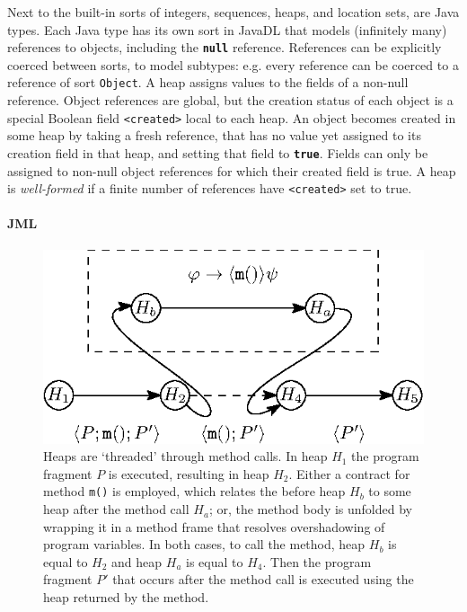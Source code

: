 \documentclass[runningheads]{llncs}
\begin{document}
Next to the built-in sorts of integers, sequences, heaps, and location sets, are Java types. Each Java type has its own sort in JavaDL that models (infinitely many) references to objects, including the \texttt{\textbf{null}} reference. References can be explicitly coerced between sorts, to model subtypes: e.g. every reference can be coerced to a reference of sort \texttt{Object}. A heap assigns values to the fields of a non-null reference.
Object references are global, but the creation status of each object is a special Boolean field \texttt{<created>} local to each heap. An object becomes created in some heap by taking a fresh reference, that has no value yet assigned to its creation field in that heap, and setting that field to \texttt{\textbf{true}}. Fields can only be assigned to non-null object references for which their created field is true. A heap is \emph{well-formed} if a finite number of references have \texttt{<created>} set to true.

\paragraph{JML}
\begin{figure}
   \centering
   \includegraphics{figures/method_heap.eps}
   \caption{Heaps are `threaded' through method calls. In heap $H_1$ the program fragment $P$ is executed, resulting in heap $H_2$. Either a contract for method \texttt{m()} is employed, which relates the before heap $H_b$ to some heap after the method call $H_a$; or, the method body is unfolded by wrapping it in a method frame that resolves overshadowing of program variables. In both cases, to call the method, heap $H_b$ is equal to $H_2$ and heap $H_a$ is equal to $H_4$. Then the program fragment $P'$ that occurs after the method call is executed using the heap returned by the method.}
   \label{fig:method_heap}
\end{figure}
\end{document}
